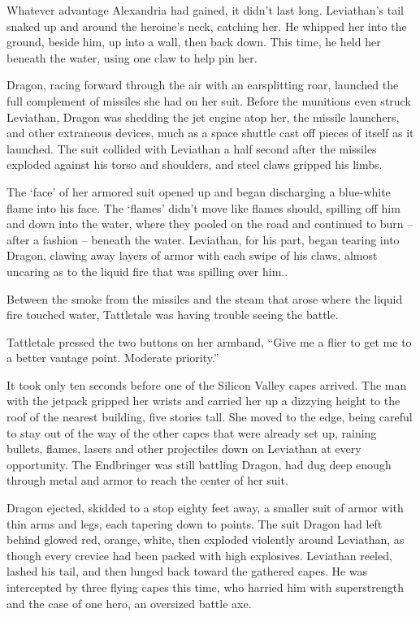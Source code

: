Whatever advantage Alexandria had gained, it didn't last long.  Leviathan's tail snaked up and around the heroine's neck, catching her.  He whipped her into the ground, beside him, up into a wall, then back down.  This time, he held her beneath the water, using one claw to help pin her.



Dragon, racing forward through the air with an earsplitting roar, launched the full complement of missiles she had on her suit.  Before the munitions even struck Leviathan, Dragon was shedding the jet engine atop her, the missile launchers, and other extraneous devices, much as a space shuttle cast off pieces of itself as it launched.  The suit collided with Leviathan a half second after the missiles exploded against his torso and shoulders, and steel claws gripped his limbs.



The `face' of her armored suit opened up and began discharging a blue-white flame into his face.  The `flames' didn't move like flames should, spilling off him and down into the water, where they pooled on the road and continued to burn – after a fashion – beneath the water.  Leviathan, for his part, began tearing into Dragon, clawing away layers of armor with each swipe of his claws, almost uncaring as to the liquid fire that was spilling over him..



Between the smoke from the missiles and the steam that arose where the liquid fire touched water, Tattletale was having trouble seeing the battle.



Tattletale pressed the two buttons on her armband, ``Give me a flier to get me to a better vantage point.  Moderate priority.''



It took only ten seconds before one of the Silicon Valley capes arrived.  The man with the jetpack gripped her wrists and carried her up a dizzying height to the roof of the nearest building, five stories tall.  She moved to the edge, being careful to stay out of the way of the other capes that were already set up, raining bullets, flames, lasers and other projectiles down on Leviathan at every opportunity.  The Endbringer was still battling Dragon, had dug deep enough through metal and armor to reach the center of her suit.



Dragon ejected, skidded to a stop eighty feet away, a smaller suit of armor with thin arms and legs, each tapering down to points.  The suit Dragon had left behind glowed red, orange, white, then exploded violently around Leviathan, as though every crevice had been packed with high explosives.  Leviathan reeled, lashed his tail, and then lunged back toward the gathered capes.  He was intercepted by three flying capes this time, who harried him with superstrength and the case of one hero, an oversized battle axe.



